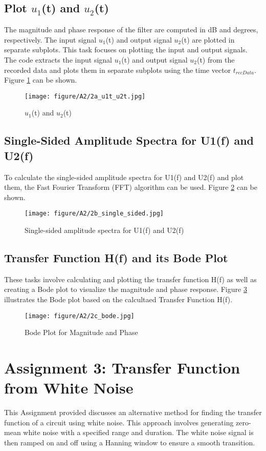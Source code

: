 \documentclass[
	a4paper,
	11pt,
]{article}
\begin{document}
\subsection{Plot $u_1$(t) and $u_2$(t)}
The magnitude and phase response of the filter are computed in dB and degrees, respectively. The input signal $u_1$(t) and output signal $u_2$(t) are plotted in separate subplots. This task focuses on plotting the input and output signals. The code extracts the input signal $u_1$(t) and output signal $u_2$(t) from the recorded data and plots them in separate subplots using the time vector $t_{recData}$. Figure \ref{fig:A2a} can be shown.

\begin{figure}[htb!]
    \centerline{\texttt{[image: figure/A2/2a\_u1t\_u2t.jpg]}}
    \caption{$u_1$(t) and $u_2$(t)}
    \label{fig:A2a}
\end{figure}

\subsection{Single-Sided Amplitude Spectra for U1(f) and U2(f)}
To calculate the single-sided amplitude spectra for U1(f) and U2(f) and plot them, the Fast Fourier Transform (FFT) algorithm can be used. Figure \ref{fig:A2b} can be shown.

\begin{figure}[h]
    \centerline{\texttt{[image: figure/A2/2b\_single\_sided.jpg]}}
    \caption{Single-sided amplitude spectra for U1(f) and U2(f)}
    \label{fig:A2b}
\end{figure}

\subsection{Transfer Function H(f) and its Bode Plot}
These tasks involve calculating and plotting the transfer function H(f) as well as creating a Bode plot to visualize the magnitude and phase response. Figure \ref{fig:A2c_bode} illustrates the Bode plot based on the calcultaed Transfer Function H(f).

\begin{figure}[h]
    \centerline{\texttt{[image: figure/A2/2c\_bode.jpg]}}
    \caption{Bode Plot for Magnitude and Phase}
    \label{fig:A2c_bode}
\end{figure}

\newpage

\section{Assignment 3: Transfer Function from White Noise}
This Assignment provided discusses an alternative method for finding the transfer function of a circuit using white noise. This approach involves generating zero-mean white noise with a specified range and duration. The white noise signal is then ramped on and off using a Hanning window to ensure a smooth transition. 
\end{document}
